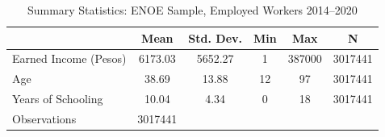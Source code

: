\begin{table}[htbp]\centering
\def\sym#1{\ifmmode^{#1}\else\(^{#1}\)\fi}
\caption{Summary Statistics: ENOE Sample, Employed Workers 2014--2020}
\begin{tabular}{l*{1}{ccccc}}
\hline\hline
                    &        Mean&   Std. Dev.&         Min&         Max&           N\\
\hline
Earned Income (Pesos)&     6173.03&     5652.27&           1&      387000&     3017441\\
Age                 &       38.69&       13.88&          12&          97&     3017441\\
Years of Schooling  &       10.04&        4.34&           0&          18&     3017441\\
\hline
Observations        &     3017441&            &            &            &            \\
\hline\hline
\end{tabular}
\end{table}
